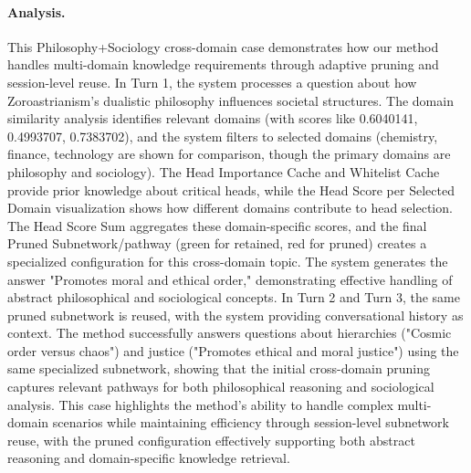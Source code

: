 \paragraph{Analysis.}
This Philosophy+Sociology cross-domain case demonstrates how our method handles multi-domain knowledge requirements through adaptive pruning and session-level reuse. In Turn 1, the system processes a question about how Zoroastrianism's dualistic philosophy influences societal structures. The domain similarity analysis identifies relevant domains (with scores like 0.6040141, 0.4993707, 0.7383702), and the system filters to selected domains (chemistry, finance, technology are shown for comparison, though the primary domains are philosophy and sociology). The Head Importance Cache and Whitelist Cache provide prior knowledge about critical heads, while the Head Score per Selected Domain visualization shows how different domains contribute to head selection. The Head Score Sum aggregates these domain-specific scores, and the final Pruned Subnetwork/pathway (green for retained, red for pruned) creates a specialized configuration for this cross-domain topic. The system generates the answer "Promotes moral and ethical order," demonstrating effective handling of abstract philosophical and sociological concepts. In Turn 2 and Turn 3, the same pruned subnetwork is reused, with the system providing conversational history as context. The method successfully answers questions about hierarchies ("Cosmic order versus chaos") and justice ("Promotes ethical and moral justice") using the same specialized subnetwork, showing that the initial cross-domain pruning captures relevant pathways for both philosophical reasoning and sociological analysis. This case highlights the method's ability to handle complex multi-domain scenarios while maintaining efficiency through session-level subnetwork reuse, with the pruned configuration effectively supporting both abstract reasoning and domain-specific knowledge retrieval.

